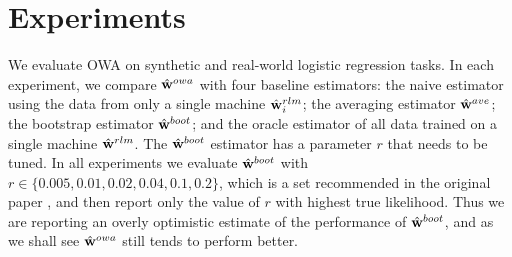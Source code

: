 \documentclass[thesis.tex]{subfiles}
\begin{document}

\section{Experiments}
\label{sec:owa:experiments}

We evaluate OWA on synthetic and real-world logistic regression tasks.
In each experiment, we compare $\hat{\mathbf w}^{owa}$ with four baseline estimators:
the naive estimator using the data from only a single machine $\hat{\mathbf w}^{rlm}_i$;
the averaging estimator $\hat{\mathbf w}^{ave}$;
the bootstrap estimator $\hat{\mathbf w}^{boot}$;
and the oracle estimator of all data trained on a single machine $\hat{\mathbf w}^{rlm}$.
The $\hat{\mathbf w}^{boot}$ estimator has a parameter $r$ that needs to be tuned.
In all experiments we evaluate $\hat{\mathbf w}^{boot}$ with $r \in \{0.005,0.01,0.02,0.04,0.1,0.2\}$,
which is a set recommended in the original paper \citep{zhang2012communication},
and then report only the value of $r$ with highest true likelihood.
Thus we are reporting an overly optimistic estimate of the performance of $\hat{\mathbf w}^{boot}$,
and as we shall see $\hat{\mathbf w}^{owa}$ still tends to perform better.


\end{document}
